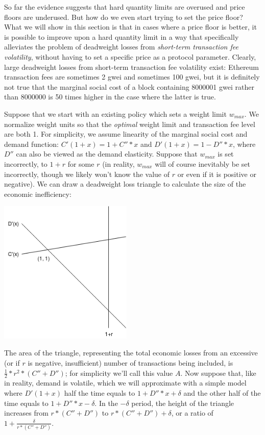 \documentclass[12pt, final]{article}
\begin{document}
So far the evidence suggests that hard quantity limits are overused and price floors are underused. But how do we even start trying to set the price floor? What we will show in this section is that in cases where a price floor is better, it is possible to improve upon a hard quantity limit in a way that specifically alleviates the problem of deadweight losses from \emph{short-term transaction fee volatility}, without having to set a specific price as a protocol parameter. Clearly, large deadweight losses from short-term transaction fee volatility exist: Ethereum transaction fees are sometimes 2 gwei and sometimes 100 gwei, but it is definitely not true that the marginal social cost of a block containing 8000001 gwei rather than 8000000 is 50 times higher in the case where the latter is true.

Suppose that we start with an existing policy which sets a weight limit $w_{max}$. We normalize weight units so that the \emph{optimal} weight limit and transaction fee level are both 1. For simplicity, we assume linearity of the marginal social cost and demand function: $C'(1 + x) = 1 + C'' * x$ and $D'(1 + x) = 1 - D'' * x$, where $D''$ can also be viewed as the demand elasticity. Suppose that $w_{max}$ is set incorrectly, to $1 + r$ for some $r$ (in reality, $w_{max}$ will of course inevitably be set incorrectly, though we likely won't know the value of $r$ or even if it is positive or negative). We can draw a deadweight loss triangle to calculate the size of the economic inefficiency:

\begin{center}
\includegraphics[width=2.5in]{Triangle1.png} \\
\end{center}

The area of the triangle, representing the total economic losses from an excessive (or if $r$ is negative, insufficient) number of transactions being included, is $\frac{1}{2} * r^2 * (C'' + D'')$; for simplicity we'll call this value $A$. Now suppose that, like in reality, demand is volatile, which we will approximate with a simple model where $D'(1 + x)$ half the time equals to $1 + D'' * x + \delta$ and the other half of the time equals to $1 + D'' * x - \delta$. In the $-\delta$ period, the height of the triangle increases from $r * (C'' + D'')$ to $r * (C'' + D'') + \delta$, or a ratio of $1 + \frac{\delta}{r * (C'' + D'')}$.
\end{document}
